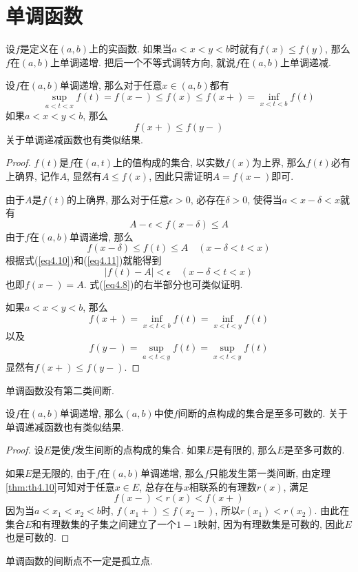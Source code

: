 \documentclass[cn,12pt,math=mtpro2,citestyle=gb7714-2015,bibstyle=gb7714-2015,twocol]{elegantbook}
\begin{document}
\section{单调函数}
\begin{definition}
设$f$是定义在$(a,b)$上的实函数. 如果当$a<x<y<b$时就有$f(x)\leq f(y)$, 那么$f$在$(a,b)$上单调递增. 把后一个不等式调转方向, 就说$f$在$(a,b)$上单调递减.
\end{definition}
\begin{theorem}\label{thm:th4.10}
  设$f$在$(a,b)$单调递增, 那么对于任意$x\in (a,b)$都有
  \begin{equation}\label{eq4.8}
   \sup_{a<t<x}f(t)=f(x-)\leq f(x)\leq f(x+)=\inf_{x<t<b}f(t)
  \end{equation}
  如果$a<x<y<b$, 那么
  \begin{equation}\label{eq4.9}
    f(x+)\leq f(y-)
  \end{equation}
  关于单调递减函数也有类似结果.
\end{theorem}
\begin{proof}
  $f(t)$是$f$在$(a,t)$上的值构成的集合, 以实数$f(x)$为上界, 那么$f(t)$必有上确界, 记作$A$, 显然有$A\leq f(x)$, 因此只需证明$A=f(x-)$即可.

  由于$A$是$f(t)$的上确界, 那么对于任意$\epsilon>0$, 必存在$\delta>0$, 使得当$a<x-\delta<x$就有
  \begin{equation}\label{eq4.10}
    A-\epsilon<f(x-\delta)\leq A
  \end{equation}
  由于$f$在$(a,b)$单调递增, 那么
  \begin{equation}\label{eq4.11}
    f(x-\delta)\leq f(t)\leq A\quad (x-\delta<t<x)
  \end{equation}
  根据式(\ref{eq4.10})和(\ref{eq4.11})就能得到
  $$|f(t)-A|<\epsilon\quad (x-\delta<t<x)$$
  也即$f(x-)=A$. 式(\ref{eq4.8})的右半部分也可类似证明.

  如果$a<x<y<b$, 那么
  $$f(x+)=\inf_{x<t<b}f(t)=\inf_{x<t<y}f(t)$$
  以及
  $$f(y-)=\sup_{a<t<y}f(t)=\sup_{x<t<y}f(t)$$
  显然有$f(x+)\leq f(y-)$.


\end{proof}
\begin{corollary}
单调函数没有第二类间断.
\end{corollary}
\begin{theorem}
  设$f$在$(a,b)$单调递增, 那么$(a,b)$中使$f$间断的点构成的集合是至多可数的. 关于单调递减函数也有类似结果.
\end{theorem}
\begin{proof}
  设$E$是使$f$发生间断的点构成的集合. 如果$E$是有限的, 那么$E$是至多可数的.

  如果$E$是无限的, 由于$f$在$(a,b)$单调递增, 那么$f$只能发生第一类间断, 由定理\ref{thm:th4.10}可知对于任意$x\in E$, 总存在与$x$相联系的有理数$r(x)$, 满足
  $$f(x-)<r(x)<f(x+)$$
  因为当$a<x_1<x_2<b$时, $f(x_1+)\leq f(x_2-)$, 所以$r(x_1)<r(x_2)$.
  由此在集合$E$和有理数集的子集之间建立了一个$1-1$映射, 因为有理数集是可数的, 因此$E$也是可数的.


\end{proof}
\begin{remark}
单调函数的间断点不一定是孤立点.
\end{remark}
\end{document}
